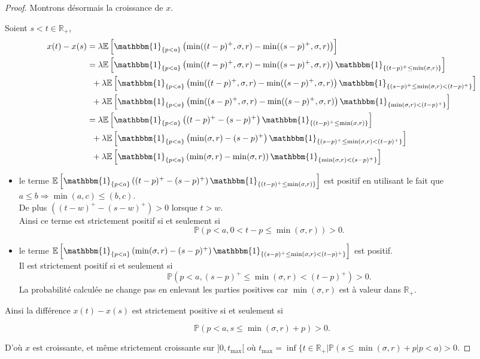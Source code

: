 \documentclass[12pt,a4paper]{article}
\newcommand{\E}[1]{\mathbb{E}\left[ #1 \right]}
\newcommand{\R}{\mathbb{R}}
\newcommand{\1}[1]{\mathbbm{1}_{\{#1\}} }
\theoremstyle{definition}
\begin{document}
{\begin{proof}
Montrons désormais la croissance de $x$.

Soient $s<t \in \R_+$,
\begin{align*}
x(t) - x(s) &= \lambda\E{\1{p<a}\left(\min((t-p)^+,\sigma,r)-\min((s-p)^+,\sigma,r)\right)}\\
&= \lambda\E{\1{p<a}\left(\min((t-p)^+,\sigma,r)-\min((s-p)^+,\sigma,r)\right)\1{(t-p)^+\leq\min(\sigma,r)}}\\
&\;\;+\lambda\E{\1{p<a}\left(\min((t-p)^+,\sigma,r)-\min((s-p)^+,\sigma,r)\right)\1{(s-p)^+\leq \min(\sigma,r)<(t-p)^+}}\\
&\;\;+\lambda\E{\1{p<a}\left(\min((s-p)^+,\sigma,r)-\min((s-p)^+,\sigma,r)\right)\1{ \min(\sigma,r)<(t-p)^+}}\\
&= \lambda\E{\1{p<a}\left((t-p)^+-(s-p)^+\right)\1{(t-p)^+\leq\min(\sigma,r)}}\\
&\;\;+\lambda\E{\1{p<a}\left(\min(\sigma,r)-(s-p)^+\right)\1{(s-p)^+\leq \min(\sigma,r)<(t-p)^+}}\\
&\;\;+\lambda\E{\1{p<a}\left(\min(\sigma,r)-\min(\sigma,r)\right)\1{ \min(\sigma,r)<(s-p)^+}}\\
\end{align*} 
\begin{itemize}
\item le terme $\E{\1{p<a}\left((t-p)^+-(s-p)^+\right)\1{(t-p)^+\leq\min(\sigma,r)}}$ est positif en utilisant le fait que $a\leq b \Rightarrow \min(a,c) \leq (b,c)$.\\
De plus $\left((t-w)^+-(s-w)^+\right) > 0$ lorsque $t>w$.\\
Ainsi ce terme est strictement positif si et seulement si
$$\mathbb{P}\left(p<a, 0<t-p\leq\min(\sigma,r)\right) > 0. $$
\item le terme $\E{\1{p<a}\left(\min(\sigma,r)-(s-p)^+\right)\1{(s-p)^+\leq \min(\sigma,r)<(t-p)^+}}$ est positif.\\
Il est strictement positif si et seulement si
$$\mathbb{P}\left(p<a, (s-p)^+\leq \min(\sigma,r)<(t-p)^+\right) > 0. $$
La probabilité calculée ne change pas en enlevant les parties positives car $\min(\sigma,r)$ est à valeur dans $\R_+$.
\end{itemize}
Ainsi la différence $x(t)-x(s)$ est strictement positive si et seulement si

$$\mathbb{P}\left(p<a, s \leq \min(\sigma,r) + p\right) > 0. $$

D'où $x$ est croissante, et même strictement croissante sur $]0,t_{\max}[$ où $t_{\max} = \inf \{t \in \R_+ | \mathbb{P}\left(s \leq \min(\sigma,r) + p\right|p<a) > 0$.


\end{proof}}
\end{document}
